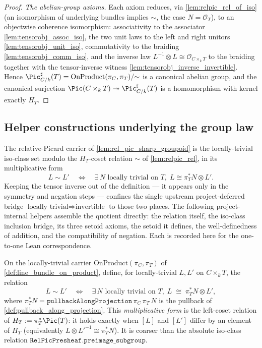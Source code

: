 \begin{proof}
  \emph{The abelian-group axioms.} Each axiom reduces, via
  \cref{lem:relpic_rel_of_iso} (an isomorphism of underlying bundles implies
  \(\sim\), the case \(N = \mathcal{O}_T\)), to an objectwise coherence
  isomorphism: associativity to the associator
  \cref{lem:tensorobj_assoc_iso}, the two unit laws to the left and right
  unitors \cref{lem:tensorobj_unit_iso}, commutativity to the braiding
  \cref{lem:tensorobj_comm_iso}, and the inverse law
  \(L^{-1} \otimes L \cong \mathcal{O}_{C \times_k T}\) to the braiding together
  with the tensor-inverse witness \cref{lem:tensorobj_inverse_invertible}. Hence
  \(\Pic^\sharp_{C/k}(T) = \mathrm{OnProduct}(\pi_C, \pi_T) / {\sim}\) is a
  canonical abelian group, and the canonical surjection
  \(\Pic(C \times_k T) \twoheadrightarrow \Pic^\sharp_{C/k}(T)\) is a
  homomorphism with kernel exactly \(H_T\).
\end{proof}

\subsection{Helper constructions underlying the group law}
\label{subsec:relpic_group_helpers}

The relative-Picard carrier of \cref{lem:rel_pic_sharp_groupoid} is the
locally-trivial iso-class set modulo the \(H_T\)-coset relation \(\sim\) of
\cref{lem:relpic_rel}, in its multiplicative form
\[
  L \sim L' \quad\Longleftrightarrow\quad
    \exists\, N \text{ locally trivial on } T,\;
    L \cong \pi_T^* N \otimes L' .
\]
Keeping the tensor inverse out of the definition --- it appears only in the
symmetry and negation steps --- confines the single upstream project-deferred
bridge \(\text{locally trivial} \Rightarrow \text{invertible}\) to those two
places. The following project-internal helpers assemble the quotient directly:
the relation itself, the iso-class inclusion bridge, its three setoid axioms,
the setoid it defines, the well-definedness of addition, and the compatibility
of negation. Each is recorded here for the one-to-one Lean correspondence.

\begin{definition}
  \label{lem:relpic_rel}
  On the locally-trivial carrier \(\mathrm{OnProduct}(\pi_C, \pi_T)\) of
  \cref{def:line_bundle_on_product}, define, for locally-trivial \(L, L'\) on
  \(C \times_k T\), the relation
  \[
    L \sim L' \quad\Longleftrightarrow\quad
      \exists\, N \text{ locally trivial on } T,\;
      L \;\cong\; \pi_T^* N \otimes L' ,
  \]
  where \(\pi_T^* N = \mathtt{pullbackAlongProjection}\,\pi_C\,\pi_T\,N\) is the
  pullback of \cref{def:pullback_along_projection}. This \emph{multiplicative
  form} is the left-coset relation of \(H_T := \pi_T^*\Pic(T)\): it holds exactly
  when \([L]\) and \([L']\) differ by an element of \(H_T\) (equivalently
  \(L \otimes L'^{-1} \cong \pi_T^* N\)). It is coarser than the absolute
  iso-class relation \(\mathtt{RelPicPresheaf.preimage\_subgroup}\).
\end{definition}

